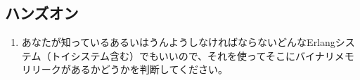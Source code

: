 \subsection*{ハンズオン}

\begin{enumerate}
  \item あなたが知っているあるいはうんようしなければならないどんなErlangシステム（トイシステム含む）でもいいので、それを使ってそこにバイナリメモリリークがあるかどうかを判断してください。
\end{enumerate}
